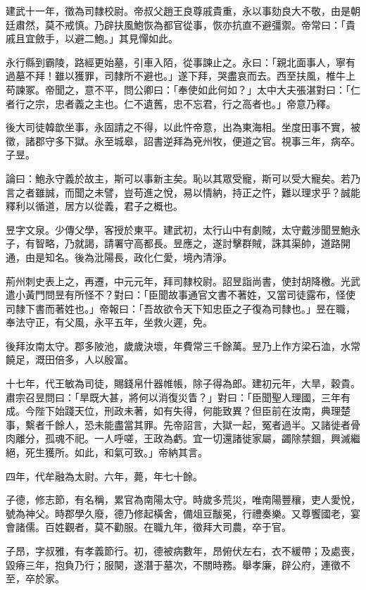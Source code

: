 \begin{pinyinscope}
建武十一年，徵為司隸校尉。帝叔父趙王良尊戚貴重，永以事劾良大不敬，由是朝廷肅然，莫不戒慎。乃辟扶風鮑恢為都官從事，恢亦抗直不避彊禦。帝常曰：「貴戚且宜斂手，以避二鮑。」其見憚如此。

永行縣到霸陵，路經更始墓，引車入陌，從事諫止之。永曰：「親北面事人，寧有過墓不拜！雖以獲罪，司隸所不避也。」遂下拜，哭盡哀而去。西至扶風，椎牛上苟諫冢。帝聞之，意不平，問公卿曰：「奉使如此何如？」太中大夫張湛對曰：「仁者行之宗，忠者義之主也。仁不遺舊，忠不忘君，行之高者也。」帝意乃釋。

後大司徒韓歆坐事，永固請之不得，以此忤帝意，出為東海相。坐度田事不實，被徵，諸郡守多下獄。永至城皋，詔書逆拜為兗州牧，便道之官。視事三年，病卒。子昱。

論曰：鮑永守義於故主，斯可以事新主矣。恥以其眾受寵，斯可以受大寵矣。若乃言之者雖誠，而聞之未譬，豈苟進之悅，易以情納，持正之忤，難以理求乎？誠能釋利以循道，居方以從義，君子之概也。

昱字文泉。少傳父學，客授於東平。建武初，太行山中有劇賊，太守戴涉聞昱鮑永子，有智略，乃就謁，請署守高都長。昱應之，遂討擊群賊，誅其渠帥，道路開通，由是知名。後為沘陽長，政化仁愛，境內清淨。

荊州刺史表上之，再遷，中元元年，拜司隸校尉。詔昱詣尚書，使封胡降檄。光武遣小黃門問昱有所怪不？對曰：「臣聞故事通官文書不著姓，又當司徒露布，怪使司隸下書而著姓也。」帝報曰：「吾故欲令天下知忠臣之子復為司隸也。」昱在職，奉法守正，有父風，永平五年，坐救火遲，免。

後拜汝南太守。郡多陂池，歲歲決壞，年費常三千餘萬。昱乃上作方梁石洫，水常饒足，溉田倍多，人以殷富。

十七年，代王敏為司徒，賜錢帛什器帷帳，除子得為郎。建初元年，大旱，穀貴。肅宗召昱問曰：「旱既大甚，將何以消復災眚？」對曰：「臣聞聖人理國，三年有成。今陛下始踐天位，刑政未著，如有失得，何能致異？但臣前在汝南，典理楚事，繫者千餘人，恐未能盡當其罪。先帝詔言，大獄一起，冤者過半。又諸徙者骨肉離分，孤魂不祀。一人呼嗟，王政為虧。宜一切還諸徙家屬，蠲除禁錮，興滅繼絕，死生獲所。如此，和氣可致。」帝納其言。

四年，代牟融為太尉。六年，薨，年七十餘。

子德，修志節，有名稱，累官為南陽太守。時歲多荒災，唯南陽豐穰，吏人愛悅，號為神父。時郡學久廢，德乃修起橫舍，備俎豆黻冕，行禮奏樂。又尊饗國老，宴會諸儒。百姓觀者，莫不勸服。在職九年，徵拜大司農，卒于官。

子昂，字叔雅，有孝義節行。初，德被病數年，昂俯伏左右，衣不緩帶；及處喪，毀瘠三年，抱負乃行；服闋，遂潛于墓次，不關時務。舉孝廉，辟公府，連徵不至，卒於家。


\end{pinyinscope}
